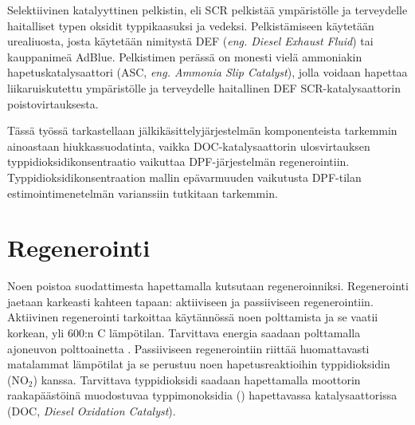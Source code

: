 Selektiivinen katalyyttinen pelkistin, eli SCR pelkistää ympäristölle ja terveydelle haitalliset typen oksidit typpikaasuksi ja vedeksi. Pelkistämiseen käytetään urealiuosta, josta käytetään nimitystä DEF (\emph{eng. Diesel Exhaust Fluid}) tai kauppanimeä AdBlue. Pelkistimen perässä on monesti vielä ammoniakin hapetuskatalysaattori (ASC, \emph{eng. Ammonia Slip Catalyst}), jolla voidaan hapettaa liikaruiskutettu ympäristölle ja terveydelle haitallinen DEF SCR-katalysaattorin poistovirtauksesta.
 \cite{dieselnet_scr}

Tässä työssä tarkastellaan jälkikäsittelyjärjestelmän komponenteista tarkemmin ainoastaan hiukkassuodatinta, vaikka DOC-katalysaattorin ulosvirtauksen typpidioksidikonsentraatio vaikuttaa DPF-järjestelmän regenerointiin. Typpidioksidikonsentraation mallin epävarmuuden vaikutusta DPF-tilan estimointimenetelmän varianssiin tutkitaan tarkemmin.



\section{Regenerointi}
Noen poistoa suodattimesta hapettamalla kutsutaan regeneroinniksi. Regenerointi jaetaan karkeasti kahteen tapaan: aktiiviseen ja passiiviseen regenerointiin. 
Aktiivinen regenerointi tarkoittaa käytännössä noen polttamista ja se
vaatii korkean, yli 600:n \degree C lämpötilan. Tarvittava energia saadaan polttamalla ajoneuvon polttoainetta  \cite{dieselnet_dpf}. Passiiviseen regenerointiin riittää huomattavasti matalammat lämpötilat ja se perustuu noen hapetusreaktioihin typpidioksidin (NO\(_2\)) kanssa. Tarvittava typpidioksidi saadaan hapettamalla moottorin raakapäästöinä muodostuvaa typpimonoksidia () hapettavassa katalysaattorissa (DOC, \emph{Diesel Oxidation Catalyst}).

